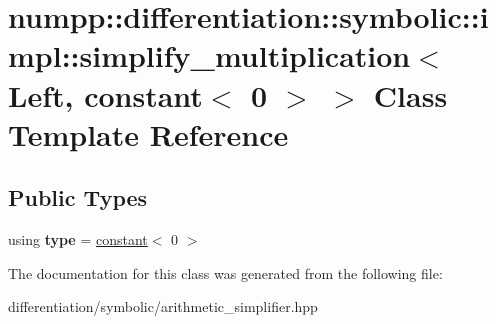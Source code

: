 \hypertarget{classnumpp_1_1differentiation_1_1symbolic_1_1impl_1_1simplify__multiplication_3_01Left_00_01constant_3_010_01_4_01_4}{}\section{numpp\+:\+:differentiation\+:\+:symbolic\+:\+:impl\+:\+:simplify\+\_\+multiplication$<$ Left, constant$<$ 0 $>$ $>$ Class Template Reference}
\label{classnumpp_1_1differentiation_1_1symbolic_1_1impl_1_1simplify__multiplication_3_01Left_00_01constant_3_010_01_4_01_4}
\subsection*{Public Types}
\begin{DoxyCompactItemize}
\item 
\mbox{\label{classnumpp_1_1differentiation_1_1symbolic_1_1impl_1_1simplify__multiplication_3_01Left_00_01constant_3_010_01_4_01_4_a246bb1e70b5f6789215fa8457c2844c6}} 
using {\bfseries type} = \hyperlink{classnumpp_1_1differentiation_1_1symbolic_1_1constant}{constant}$<$ 0 $>$
\end{DoxyCompactItemize}


The documentation for this class was generated from the following file\+:\begin{DoxyCompactItemize}
\item 
differentiation/symbolic/arithmetic\+\_\+simplifier.\+hpp\end{DoxyCompactItemize}
